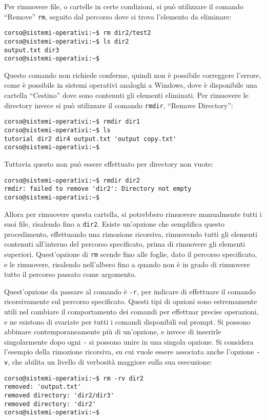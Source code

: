 \documentclass{article}
\numberwithin{equation}{subsection}
\begin{document}
Per rimuovere file, o cartelle in certe condizioni, si può utilizzare il comando ``Remove'' \verb|rm|, seguito dal percorso dove si trova l'elemento da eliminare:
\begin{verbatim}
corso@sistemi-operativi:~$ rm dir2/test2
corso@sistemi-operativi:~$ ls dir2
output.txt dir3
corso@sistemi-operativi:~$
\end{verbatim}
Questo comando non richiede conferme, quindi non è possibile correggere l'errore, come è possibile in sistemi operativi analoghi a Windows, dove è disponibile una cartella ``Cestino'' dove sono contenuti gli 
elementi eliminati. Per rimuovere le directory invece si può utilizzare il comando \verb|rmdir|, ``Remove Directory'':
\begin{verbatim}
corso@sistemi-operativi:~$ rmdir dir1
corso@sistemi-operativi:~$ ls
tutorial dir2 dir4 output.txt 'output copy.txt'
corso@sistemi-operativi:~$
\end{verbatim}
Tuttavia questo non può essere effettuato per directory non vuote: 
\begin{verbatim}
corso@sistemi-operativi:~$ rmdir dir2
rmdir: failed to remove 'dir2': Directory not empty 
corso@sistemi-operativi:~$
\end{verbatim}

Allora per rimuovere questa cartella, si potrebbero rimuovere manualmente tutti i suoi file, risalendo fino a \verb|dir2|. Esiste un'opzione che semplifica questo procedimento, effettuando una rimozione ricorsiva, 
rimuovendo tutti gli elementi contenuti all'interno del percorso specificato, prima di rimuovere gli elementi superiori. Quest'opzione di \verb|rm| scende fino alle foglie, dato il percorso specificato, e le rimuovere, 
risalendo nell'albero fino a quando non è in grado di rimuovere tutto il percorso passato come argomento. 

Quest'opzione da passare al comando è \verb|-r|, per indicare di effettuare il comando ricorsivamente sul percorso specificato. Questi tipi di opzioni sono estremamente utili nel cambiare il comportamento dei 
comandi per effettuar precise operazioni, e ne esistono di svariate per tutti i comandi disponibili sul prompt. Si possono abbinare contemporaneamente più di un'opzione, e invece di inserirle singolarmente dopo ogni 
\verb|-| si possono unire in una singola opzione. Si considera l'esempio della rimozione ricorsiva, su cui vuole essere associata anche l'opzione \verb|-v|, che abilita un livello di verbosità maggiore sulla 
sua esecuzione:
\begin{verbatim}
corso@sistemi-operativi:~$ rm -rv dir2
removed: 'output.txt'
removed directory: 'dir2/dir3'
removed directory: 'dir2'
corso@sistemi-operativi:~$
\end{verbatim}
\end{document}
